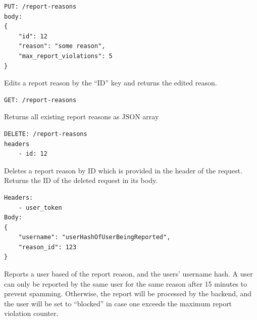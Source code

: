 \begin{lstlisting}[label={lst:lstlisting8}]
PUT: /report-reasons
body:
{
    "id": 12
    "reason": "some reason",
    "max_report_violations": 5
}
\end{lstlisting}

Edits a report reason by the \enquote{ID} key and returns the edited reason.

\begin{lstlisting}[label={lst:lstlisting9}]
GET: /report-reasons
\end{lstlisting}

Returns all existing report reasons as JSON array

\begin{lstlisting}[label={lst:lstlisting10}]
DELETE: /report-reasons
headers
    - id: 12
\end{lstlisting}

Deletes a report reason by ID which is provided in the header of the request.
Returns the ID of the deleted request in its body.

\begin{lstlisting}[label={lst:lstlisting11}]
Headers:
    - user_token
Body:
{
    "username": "userHashOfUserBeingReported",
    "reason_id": 123
}
\end{lstlisting}

Reports a user based of the report reason, and the users' username hash.
A user can only be reported by the same user for the same reason after 15 minutes to prevent spamming.
Otherwise, the report will be processed by the backend, and the user will be set to \enquote{blocked} in case one
exceeds the maximum report violation counter.

